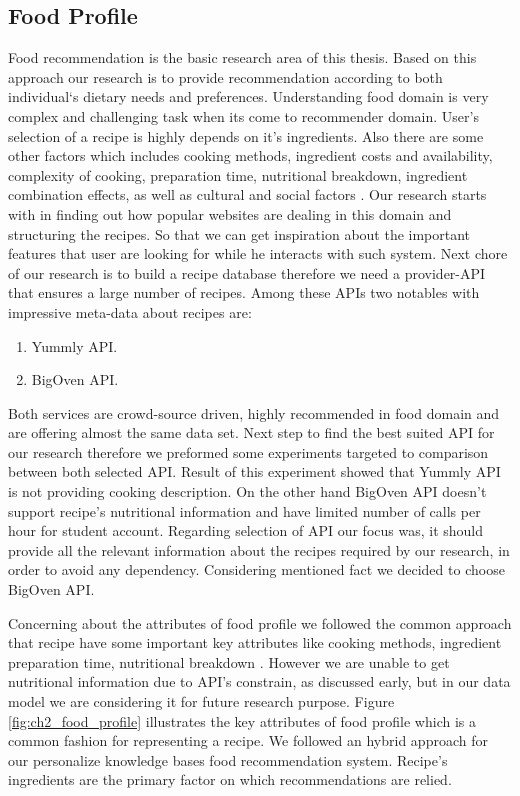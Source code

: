 \subsection{Food Profile}

Food recommendation is the basic research area of this thesis. Based on this approach our research is to provide recommendation according to both individual‘s dietary needs and preferences. Understanding food domain is very complex and challenging task when its come to recommender domain. User’s selection of a recipe is highly depends on it’s ingredients. Also there are some other factors which includes cooking methods, ingredient costs and availability, complexity of cooking, preparation time, nutritional breakdown, ingredient combination effects, as well as cultural and social factors \cite{freyne2010recommending}. Our research starts with in finding out how popular websites are dealing in this domain and structuring the recipes. So that we can get inspiration about the important features that user are looking for while he interacts with such system. Next chore of our research is to build a recipe database therefore we need a provider-API that ensures a large number of recipes. Among these APIs two notables with impressive meta-data about recipes are:

\begin{enumerate}
	\item Yummly API.
	\item BigOven API.	
\end{enumerate}

Both services are crowd-source driven, highly recommended in food domain and are offering almost the same data set. Next step to find the best suited API for our research therefore we preformed some experiments targeted to comparison between both selected API. Result of this experiment showed that Yummly API is not providing cooking description. On the other hand BigOven API doesn’t support recipe’s nutritional information and have limited number of calls per hour for student account. Regarding selection of API our focus was, it should provide all the relevant information about the recipes required by our research, in order to avoid any dependency. Considering mentioned fact we decided to choose BigOven API.\newline

Concerning about the attributes of food profile we followed the common approach that recipe have some important key attributes like cooking methods, ingredient preparation time, nutritional breakdown \cite{freyne2010recommending}.  However we are unable to get nutritional information due to API’s constrain, as discussed early, but in our data model we are considering it for future research purpose.  Figure \ref{fig:ch2_food_profile} illustrates the key attributes of food profile which is a common fashion for representing a recipe. We followed an hybrid approach \cite{suksom2010knowledge}
\cite{teng2012recipe} \cite{freyne2010recommending} for our personalize knowledge bases food recommendation system. Recipe’s ingredients are the primary factor on which recommendations are relied. 

